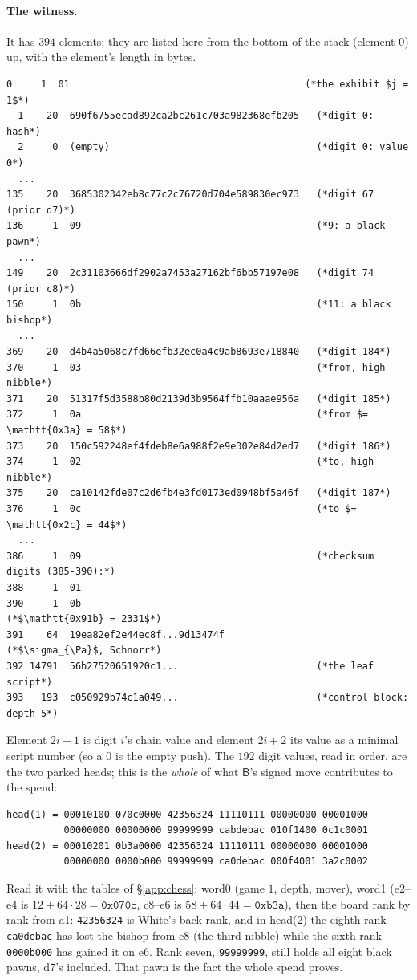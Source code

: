 \documentclass[11pt]{article}
\newcommand{\Pa}{\mathsf{A}}
\newcommand{\Pb}{\mathsf{B}}
\begin{document}
\paragraph{The witness.} It has $394$ elements; they are listed here
from the bottom of the stack (element $0$) up, with the element's
length in bytes.
\begin{lstlisting}[style=script]
  0     1  01                                         (*the exhibit $j = 1$*)
  1    20  690f6755ecad892ca2bc261c703a982368efb205   (*digit 0: hash*)
  2     0  (empty)                                    (*digit 0: value 0*)
  ...
135    20  3685302342eb8c77c2c76720d704e589830ec973   (*digit 67 (prior d7)*)
136     1  09                                         (*9: a black pawn*)
  ...
149    20  2c31103666df2902a7453a27162bf6bb57197e08   (*digit 74 (prior c8)*)
150     1  0b                                         (*11: a black bishop*)
  ...
369    20  d4b4a5068c7fd66efb32ec0a4c9ab8693e718840   (*digit 184*)
370     1  03                                         (*from, high nibble*)
371    20  51317f5d3588b80d2139d3b9564ffb10aaae956a   (*digit 185*)
372     1  0a                                         (*from $= \mathtt{0x3a} = 58$*)
373    20  150c592248ef4fdeb8e6a988f2e9e302e84d2ed7   (*digit 186*)
374     1  02                                         (*to, high nibble*)
375    20  ca10142fde07c2d6fb4e3fd0173ed0948bf5a46f   (*digit 187*)
376     1  0c                                         (*to $= \mathtt{0x2c} = 44$*)
  ...
386     1  09                                         (*checksum digits (385-390):*)
388     1  01
390     1  0b                                         (*$\mathtt{0x91b} = 2331$*)
391    64  19ea82ef2e44ec8f...9d13474f                (*$\sigma_{\Pa}$, Schnorr*)
392 14791  56b27520651920c1...                        (*the leaf script*)
393   193  c050929b74c1a049...                        (*control block: depth 5*)
\end{lstlisting}
Element $2i+1$ is digit $i$'s chain value and element $2i+2$ its
value as a minimal script number (so a $0$ is the empty push). The
$192$ digit values, read in order, are the two parked heads; this is
the \emph{whole} of what $\Pb$'s signed move contributes to the spend:
\begin{lstlisting}[style=script]
head(1) = 00010100 070c0000 42356324 11110111 00000000 00001000
          00000000 00000000 99999999 cabdebac 010f1400 0c1c0001
head(2) = 00010201 0b3a0000 42356324 11110111 00000000 00001000
          00000000 0000b000 99999999 ca0debac 000f4001 3a2c0002
\end{lstlisting}
Read it with the tables of \S\ref{app:chess}: word0 (game $1$, depth,
mover), word1 (e2--e4 is $12 + 64 \cdot 28 = \mathtt{0x070c}$, c8--e6
is $58 + 64 \cdot 44 = \mathtt{0xb3a}$), then the board rank by rank
from a1: \texttt{42356324} is White's back rank, and in head(2) the
eighth rank \texttt{ca0debac} has lost the bishop from c8 (the third
nibble) while the sixth rank \texttt{0000b000} has gained it on e6.
Rank seven, \texttt{99999999}, still holds all eight black pawns,
d7's included. That pawn is the fact the whole spend proves.
\end{document}
